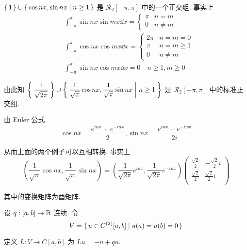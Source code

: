 \begin{example}
    $\set{1}\cup\set{\cos nx,\sin nx|n\ge 1}$ 是 $\mathcal{R}_2[-\pi,\pi]$ 中的一个正交组. 事实上
$$
\begin{aligned}
    &\int_{-\pi}^\pi\sin nx\sin mx\dd x=\begin{cases}
        \pi & n=m\\
        0 & n\ne m
    \end{cases}\\
    &\int_{-\pi}^\pi\cos nx\cos mx\dd x=\begin{cases}
        2\pi & n=m=0\\
        \pi & n=m\ge 1\\
        0 & n\ne m
    \end{cases}\\
    &\int_{-\pi}^{\pi}\sin{nx}\cos{mx}\dd x=0\quad n\ge 1,m\ge 0
\end{aligned}
$$

    由此知 $\displaystyle\Set{\frac{1}{\sqrt{2\pi}}}\cup\Set{\frac{1}{\sqrt{\pi}}\cos nx,\frac{1}{\sqrt{\pi}}\sin nx|n\ge 1}$ 是 $\mathcal{R}_2[-\pi,\pi]$ 中的标准正交组.
\end{example}

\begin{hint}
    由 Euler 公式
$$
\cos nx=\frac{e^{inx}+e^{-inx}}{2},\sin nx=\frac{e^{inx}-e^{-inx}}{2i}
$$

    从而上面的两个例子可以互相转换. 事实上
$$
\left(\frac{1}{\sqrt{\pi}}\cos nx,\frac{1}{\sqrt{\pi}}\sin nx\right)=\left(\frac{1}{\sqrt{2\pi}}e^{inx},\frac{1}{\sqrt{2\pi}}e^{-inx}\right)\begin{pmatrix}
    \frac{\sqrt{2}}{2} & -\frac{\sqrt{2}}{2}i\\
    \frac{\sqrt{2}}{2} & \frac{\sqrt{2}}{2}i\\
\end{pmatrix}
$$

    其中的变换矩阵为酉矩阵.
\end{hint}

\begin{example}
    设 $q:[a,b]\to\mathbb{R}$ 连续. 令
$$
V=\set{u\in C^{(2)}[a,b]|u(a)=u(b)=0}
$$

    定义 $L:V\to C[a,b]$ 为 $Lu=-\ddot{u}+qu$.
\end{example}

